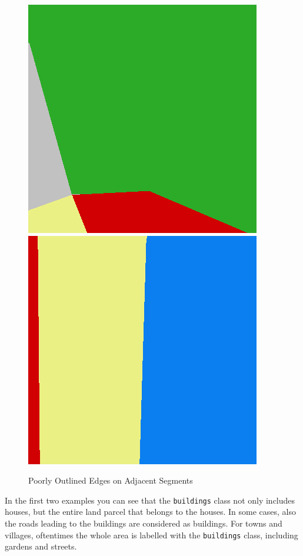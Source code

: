 \begin{figure}
    \includegraphics[width=\LabelConsiderationImageWidth]{images/consideration_labels/69493-label}
    \hspace{1mm}
    \includegraphics[width=\LabelConsiderationImageWidth]{images/consideration_labels/71270-label}

    \caption{Poorly Outlined Edges on Adjacent Segments}
    \label{fig:label_considerations}
\end{figure}

In the first two examples you can see that the \texttt{buildings} class not only includes houses, but the entire land parcel that belongs to the houses. In some cases, also the roads leading to the buildings are considered as buildings. For towns and villages, oftentimes the whole area is labelled with the \texttt{buildings} class, including gardens and streets.

